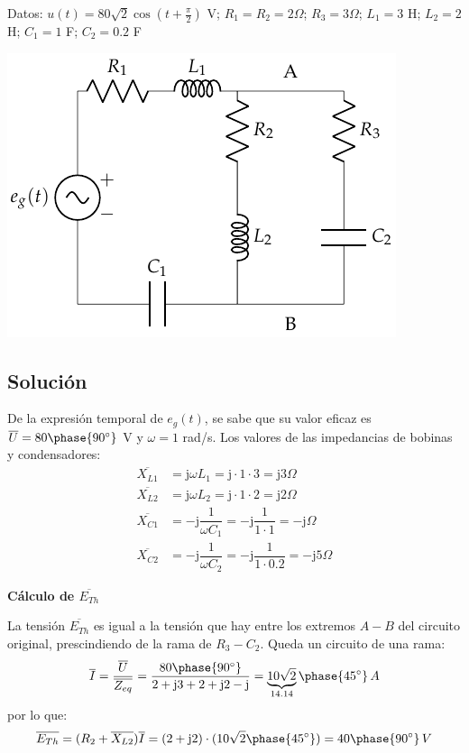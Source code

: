 Datos: $u(t)=80\sqrt{2}\cos(t+\frac{\pi}{2})$ V; $R_1=R_2=2\Omega$;
$R_3=3\Omega$; $L_1=3$ H; $L_2=2$ H; $C_1=1$ F; $C_2=0.2$ F

\begin{center}
  \includegraphics{figuras/BT2_19.pdf}
\end{center}

\subsection*{Solución}

De la expresión temporal de $e_g(t)$, se sabe
que su valor eficaz es $\overline{U}=80\phase{90^\circ}$ V y
$\omega=1$ rad/s. Los valores de las impedancias de bobinas y
condensadores:
\begin{align*}
  \overline{X_{L1}}&=\mathrm{j}\omega L_1=\mathrm{j}\cdot 1\cdot 3=\mathrm{j} 3\Omega\\
  \overline{X_{L2}}&=\mathrm{j}\omega L_2=\mathrm{j}\cdot 1\cdot 2=\mathrm{j} 2\Omega\\
  \overline{X_{C1}}&=-\mathrm{j}\dfrac{1}{\omega C_1}=-\mathrm{j}\dfrac{1}{1\cdot 1}=-\mathrm{j} \Omega\\
  \overline{X_{C2}}&=-\mathrm{j}\dfrac{1}{\omega C_2}=-\mathrm{j}\dfrac{1}{1\cdot 0.2}=-\mathrm{j} 5\Omega
\end{align*}
    
\textbf{Cálculo de $\overline{E_{Th}}$}
    
La tensión $\overline{E_{Th}}$ es igual a la tensión que hay entre los
extremos $A-B$ del circuito original, prescindiendo de la rama de
$R_3-C_2$. Queda un circuito de una rama:
\begin{equation*}
  \overline{I}=\dfrac{\overline{U}}{\overline{Z_{eq}}}=\dfrac{80\phase{90^\circ}}{2+\mathrm{j} 3+2+\mathrm{j} 2-\mathrm{j}}=\underbrace{10\sqrt{2}}_{14.14}\phase{45^\circ}\,A
\end{equation*}
por lo que:
\begin{equation*}
  \overline{E_{Th}}=(R_2+\overline{X_{L2}})\overline{I}=(2+\mathrm{j} 2)\cdot(10\sqrt{2}\phase{45^\circ})={40\phase{90^\circ}\,V}
\end{equation*}
    

